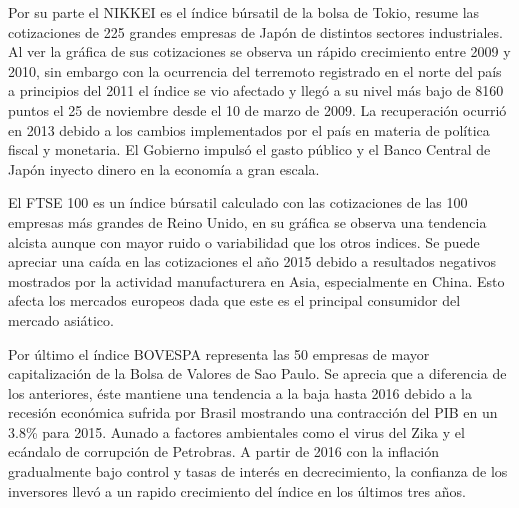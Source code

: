 \documentclass[a4paper,12pt]{Latex/Classes/PhDthesisPSnPDF}
\begin{document}
Por su parte el NIKKEI es el índice búrsatil de la bolsa de Tokio, resume las cotizaciones de 225 grandes empresas de Japón de distintos sectores industriales. Al ver la gráfica de sus cotizaciones se observa un rápido crecimiento entre 2009 y 2010, sin embargo con la ocurrencia del terremoto registrado en el norte del país a principios del 2011 el índice se vio afectado y llegó a su nivel más bajo de 8160 puntos el 25 de noviembre desde el 10 de marzo de 2009. La recuperación ocurrió en 2013 debido a los cambios implementados por el país en materia de política fiscal y monetaria. El Gobierno impulsó el gasto público y el Banco Central de Japón inyecto dinero en la economía a gran escala.

El FTSE 100 es un índice búrsatil calculado con las cotizaciones de las 100 empresas más grandes de Reino Unido, en su gráfica se observa una tendencia alcista aunque con mayor ruido o variabilidad que los otros indices. Se puede apreciar una caída en las cotizaciones el año 2015 debido a resultados negativos mostrados por la actividad manufacturera en Asia, especialmente en China. Esto afecta los mercados europeos dada que este es el principal consumidor del mercado asiático.

Por último el índice BOVESPA representa las 50 empresas de mayor capitalización de la Bolsa de Valores de Sao Paulo. Se aprecia que a diferencia de los anteriores, éste mantiene una tendencia a la baja hasta 2016 debido a la recesión económica sufrida por Brasil mostrando una contracción del PIB en un 3.8\% para 2015. Aunado a factores ambientales como el virus del Zika y el ecándalo de corrupción de Petrobras. A partir de 2016 con la inflación gradualmente bajo control y tasas de interés en decrecimiento, la confianza de los inversores llevó a un rapido crecimiento del índice en los últimos tres años.
\end{document}
